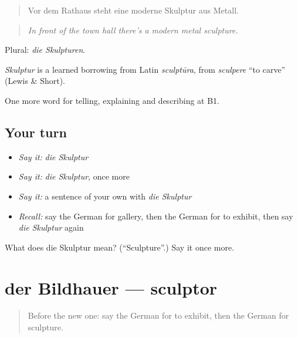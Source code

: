 \begin{quote}
Vor dem Rathaus steht eine moderne Skulptur aus Metall.
\end{quote}

\begin{quote}
\emph{In front of the town hall there's a modern metal sculpture.}
\end{quote}

Plural: \emph{die Skulpturen}.

\begin{cousinweb}
\emph{Skulptur} is a learned borrowing from Latin \emph{sculptūra}, from \emph{sculpere} \textquotedblleft{}to carve\textquotedblright{} (Lewis \& Short).
\end{cousinweb}

\begin{grammarlens}[title={What you've built}]
One more word for telling, explaining and describing at B1.
\end{grammarlens}

\subsection*{Your turn}
\begin{itemize}
\raggedright
  \item \emph{Say it:} \emph{die Skulptur}
  \item \emph{Say it:} \emph{die Skulptur}, once more
  \item \emph{Say it:} a sentence of your own with \emph{die Skulptur}
  \item \emph{Recall:} say the German for gallery, then the German for to exhibit, then say \emph{die Skulptur} again
\end{itemize}

\begin{tcolorbox}[breakable,colback=teal!4,colframe=teal!35!black,title={Before you move on}]
What does die Skulptur mean? (\textquotedblleft{}Sculpture\textquotedblright{}.) Say it once more.
\end{tcolorbox}
\section[der Bildhauer]{der Bildhauer — sculptor}

\label{lesson:GE-C519-bildhauer}



\begin{quote}
Before the new one: say the German for to exhibit, then the German for sculpture.
\end{quote}

